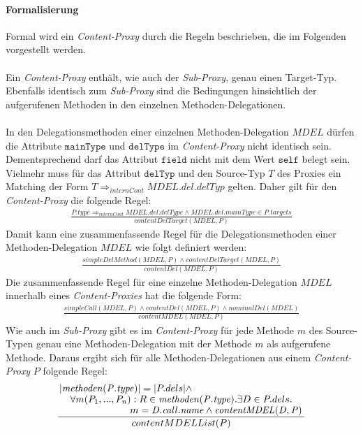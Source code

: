 \documentclass[a4paper,12pt]{article}
\begin{document}
\paragraph{Formalisierung}
Formal wird ein \emph{Content-Proxy} durch die Regeln beschrieben, die im Folgenden vorgestellt werden.\\\\
Ein \emph{Content-Proxy} enthält, wie auch der \emph{Sub-Proxy}, genau einen Target-Typ. Ebenfalls identisch zum \emph{Sub-Proxy} sind die Bedingungen hinsichtlich der aufgerufenen Methoden in den einzelnen Methoden-Delegationen.\\\\
In den Delegationsmethoden einer einzelnen Methoden-Delegation $\mathit{MDEL}$ dürfen die Attribute $\texttt{mainType}$ und $\texttt{delType}$ im \emph{Content-Proxy} nicht identisch sein. Dementsprechend darf das Attribut $\texttt{field}$ nicht mit dem Wert $\texttt{self}$ belegt sein. Vielmehr muss für das Attribut $\texttt{delTyp}$ und den Source-Typ $T$ des Proxies ein Matching der Form $T \Rightarrow_{internCont} \mathit{MDEL.del.delTyp}$ gelten. Daher gilt für den \emph{Content-Proxy} die folgende Regel:
\begin{gather*}
\frac{\mathit{P.type} \Rightarrow_{internCont} \mathit{MDEL.del.delType}  \wedge \mathit{MDEL.del.mainType} \in \mathit{P.targets}}
{\mathit{contentDelTarget(MDEL,P)}}
\end{gather*}
\noindent
Damit kann eine zusammenfassende Regel für die Delegationsmethoden einer Methoden-Delegation $\mathit{MDEL}$ wie folgt definiert werden:
\begin{gather*}
\frac{\mathit{simpleDelMethod(MDEL,P)} \wedge \mathit{contentDelTarget(MDEL,P)}}
{\mathit{contentDel(MDEL,P)}}
\end{gather*}
Die zusammenfassende Regel für eine einzelne Methoden-Delegation $\mathit{MDEL}$ innerhalb eines \emph{Content-Proxies} hat die folgende Form:
\begin{gather*}
\frac{\mathit{simpleCall(MDEL,P)} \wedge \mathit{contentDel(MDEL,P) \wedge \mathit{nominalDel(MDEL)}}}
{\mathit{contentMDEL(MDEL,P)}}
\end{gather*}
Wie auch im \emph{Sub-Proxy} gibt es im \emph{Content-Proxy} für jede Methode $m$ des Source-Typen genau eine Methoden-Delegation mit der Methode $m$ als aufgerufene Methode. Daraus ergibt sich für alle Methoden-Delegationen aus einem \emph{Content-Proxy} $P$ folgende Regel:
\begin{gather*}
\frac{\splitfrac{|\mathit{methoden(P.type)}| = |P.dels| \wedge}{ \splitfrac{\forall m(P_1,...,P_n):R \in \mathit{methoden(P.type)}.\exists D \in P.dels.}{m = \mathit{D.call.name} \wedge \mathit{contentMDEL(D,P)}
 }}
}
{contentMDELList(P)}
\end{gather*}
\end{document}
